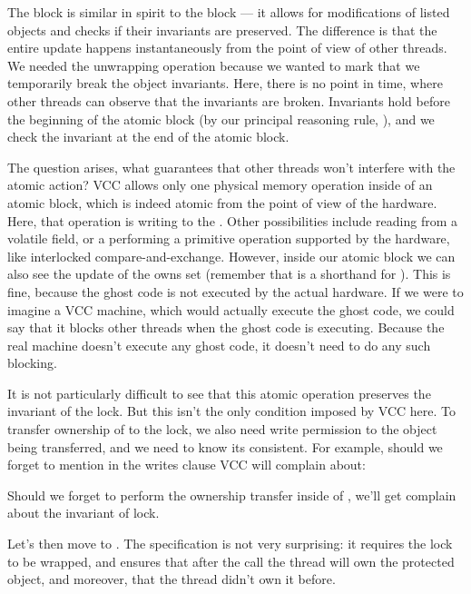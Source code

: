 The  block is similar in spirit to the  block ---
it allows for modifications of listed objects and checks if their invariants
are preserved.
The difference is that the entire update happens instantaneously from the point
of view of other threads.
We needed the unwrapping operation because we wanted to mark that we temporarily
break the object invariants.
Here, there is no point in time, where other threads can observe that the invariants
are broken.
Invariants hold before the beginning of the atomic block (by our principal reasoning
rule, ), and we check the invariant at the end of the atomic block.

The question arises, what guarantees that other threads won't interfere with the atomic
action?
VCC allows only one physical memory operation inside of an atomic block,
which is indeed atomic from the point of view of the hardware.
Here, that operation is writing to the .
Other possibilities include reading from a volatile field, or a performing
a primitive operation supported by the hardware, like interlocked
compare-and-exchange.
However, inside our atomic block we can also see the update of the owns set
(remember that  is a shorthand for ).
This is fine, because the ghost code is not executed by the actual hardware.
If we were to imagine a VCC machine, which would actually execute the 
ghost code, we could say that it blocks other threads when the ghost
code is executing.
Because the real machine doesn't execute any ghost code, it doesn't need to do
any such blocking.

It is not particularly difficult to see that this atomic operation preserves the
invariant of the lock.
But this isn't the only condition imposed by VCC here.
To transfer ownership of  to the lock, we also need
write permission to the object being transferred, and
we need to know its consistent.
For example, should we forget to mention 
in the writes clause VCC will complain about:


\noindent
Should we forget to perform the ownership transfer inside of , we'll get complain
about the invariant of lock.


Let's then move to . 
The specification is not very surprising: it requires the lock to be wrapped,
and ensures that after the call the thread will own the protected object,
and moreover, that the thread didn't own it before.

